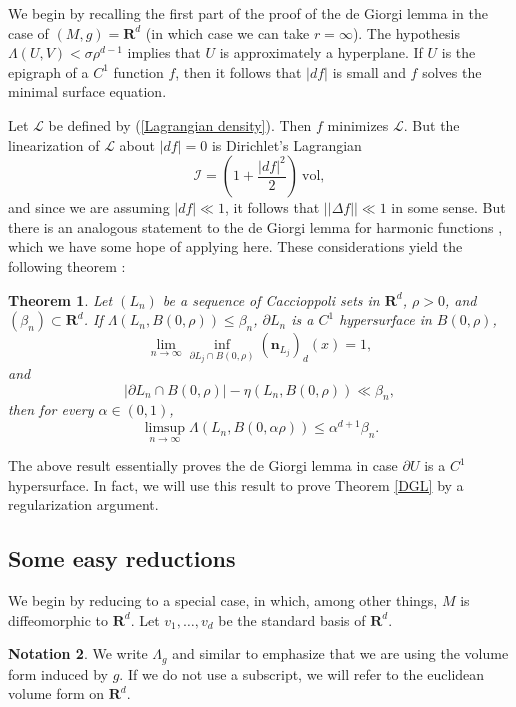 \documentclass[reqno,12pt,letterpaper]{amsart}
\newcommand{\RR}{\mathbf{R}}
\newcommand{\normal}{\mathbf n}
\newcommand{\vol}{\mathrm{vol}}
\newtheorem{theorem}{Theorem}[section]
\theoremstyle{definition}
\newtheorem{notation}[theorem]{Notation}
\numberwithin{equation}{section}
\begin{document}
We begin by recalling the first part of the proof of the de Giorgi lemma in the case of $(M, g) = \RR^d$ (in which case we can take $r = \infty$).
The hypothesis $\Lambda(U, V) < \sigma \rho^{d - 1}$ implies that $U$ is approximately a hyperplane.
If $U$ is the epigraph of a $C^1$ function $f$, then it follows that $|df|$ is small and $f$ solves the minimal surface equation.

Let $\mathscr L$ be defined by (\ref{Lagrangian density}). Then $f$ minimizes $\mathscr L$.
But the linearization of $\mathscr L$ about $|df| = 0$ is Dirichlet's Lagrangian
$$\mathscr I = (1 + \frac{|df|^2}{2}) ~\vol,$$
and since we are assuming $|df| \ll 1$, it follows that $||\Delta f|| \ll 1$ in some sense.
But there is an analogous statement to the de Giorgi lemma for harmonic functions \cite[Lemma 4.1]{Miranda66}, which we have some hope of applying here.
These considerations yield the following theorem \cite[Teorema 4.4]{Miranda66}:

\begin{theorem}\label{DGL C1}
Let $(L_n)$ be a sequence of Caccioppoli sets in $\RR^d$, $\rho > 0$, and $(\beta_n) \subset \RR^d$.
If $\Lambda(L_n, B(0, \rho)) \leq \beta_n$, $\partial L_n$ is a $C^1$ hypersurface in $B(0, \rho)$,
$$\lim_{n \to \infty} \inf_{\partial L_j \cap B(0, \rho)} (\normal_{L_j})_d(x) = 1,$$
and
$$|\partial L_n \cap B(0, \rho)| - \eta(L_n, B(0, \rho)) \ll \beta_n,$$
then for every $\alpha \in (0, 1)$,
$$\limsup_{n \to \infty} \Lambda(L_n, B(0, \alpha \rho)) \leq \alpha^{d + 1} \beta_n.$$
\end{theorem}

The above result essentially proves the de Giorgi lemma in case $\partial U$ is a $C^1$ hypersurface.
In fact, we will use this result to prove Theorem \ref{DGL} by a regularization argument.

\subsection{Some easy reductions}
We begin by reducing to a special case, in which, among other things, $M$ is diffeomorphic to $\RR^d$.
Let $v_1, \dots, v_d$ be the standard basis of $\RR^d$.

\begin{notation}
We write $\Lambda_g$ and similar to emphasize that we are using the volume form induced by $g$.
If we do not use a subscript, we will refer to the euclidean volume form on $\RR^d$.
\end{notation}
\end{document}

